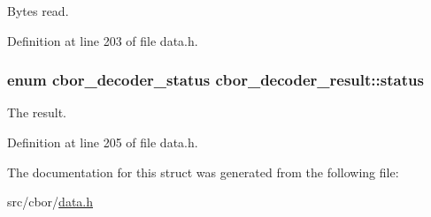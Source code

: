 Bytes read. 



Definition at line 203 of file data.\-h.

\hypertarget{structcbor__decoder__result_a1b775085d3696356c9ca284ffd9a264d}{
\subsubsection[{status}]{\setlength{\rightskip}{0pt plus 5cm}enum {\bf cbor\-\_\-decoder\-\_\-status} cbor\-\_\-decoder\-\_\-result\-::status}}\label{structcbor__decoder__result_a1b775085d3696356c9ca284ffd9a264d}


The result. 



Definition at line 205 of file data.\-h.



The documentation for this struct was generated from the following file\-:\begin{DoxyCompactItemize}
\item 
src/cbor/\hyperlink{data_8h}{data.\-h}\end{DoxyCompactItemize}
